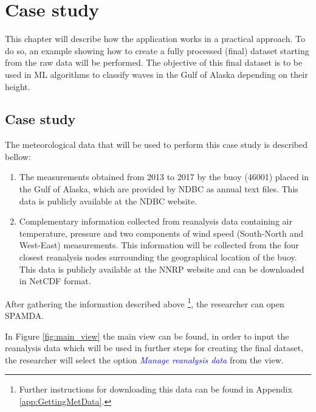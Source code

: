 
\chapter{Case study}

	\begin{onehalfspace}
	
		This chapter will describe how the application works in a practical approach. To do so, an example showing how to create a fully processed (final) dataset starting from the raw data will be performed. The objective of this final dataset is to be used in ML algorithms to classify waves in the Gulf of Alaska depending on their height.
		
		\section{Case study}
		
		The meteorological data that will be used to perform this case study is described bellow:
		
			\begin{enumerate}
			\item The measurements obtained from 2013 to 2017 by the buoy (46001) placed in the Gulf of Alaska, which are provided by NDBC as annual text files. This data is publicly available at the NDBC website. 
			\item Complementary information collected from reanalysis data containing air temperature, pressure and two components of wind speed (South-North and West-East) measurements. This information will be collected from the four closest reanalysis nodes surrounding the geographical location of the buoy. This data is publicly available at the NNRP website and can be downloaded in NetCDF format.
			\end{enumerate}

			After gathering the information described above \footnote{Further instructions for downloading this data can be found in Appendix \ref{app:GettingMetData}.}, the researcher can open SPAMDA.
			
			In Figure \ref{fig:main_view} the main view can be found, in order to input the reanalysis data which will be used in further steps for creating the final dataset, the researcher will select the option \textcolor{blue}{\textit{Manage reanalysis data}} from the view.
			

\end{onehalfspace}
